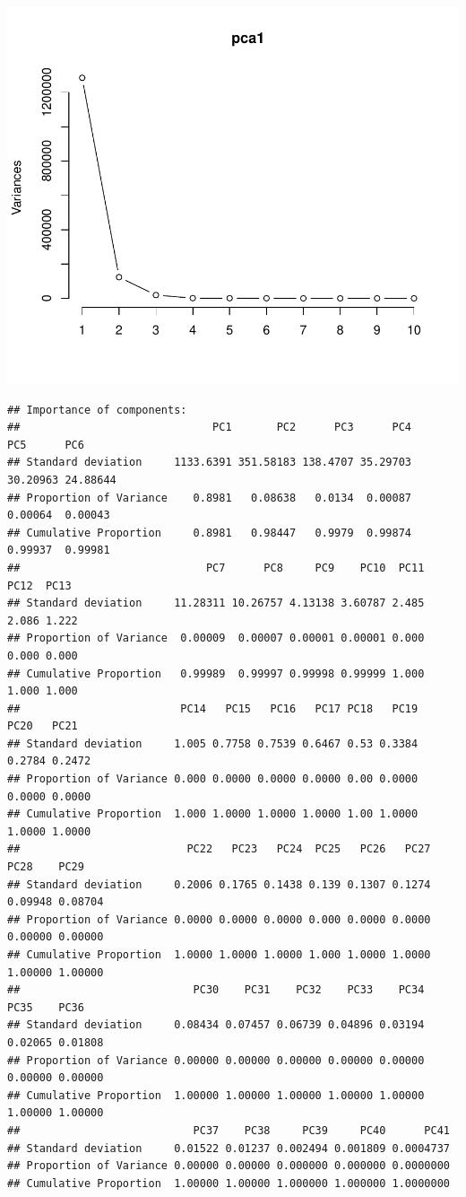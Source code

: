 \documentclass[11pt,preprint, authoryear]{elsarticle}
\numberwithin{equation}{section}
\numberwithin{figure}{section}
\numberwithin{table}{section}
\begin{document}
\includegraphics{Essay_files/figure-latex/unnamed-chunk-5-1.pdf}

\begin{verbatim}
## Importance of components:
##                              PC1       PC2      PC3      PC4      PC5      PC6
## Standard deviation     1133.6391 351.58183 138.4707 35.29703 30.20963 24.88644
## Proportion of Variance    0.8981   0.08638   0.0134  0.00087  0.00064  0.00043
## Cumulative Proportion     0.8981   0.98447   0.9979  0.99874  0.99937  0.99981
##                             PC7      PC8     PC9    PC10  PC11  PC12  PC13
## Standard deviation     11.28311 10.26757 4.13138 3.60787 2.485 2.086 1.222
## Proportion of Variance  0.00009  0.00007 0.00001 0.00001 0.000 0.000 0.000
## Cumulative Proportion   0.99989  0.99997 0.99998 0.99999 1.000 1.000 1.000
##                         PC14   PC15   PC16   PC17 PC18   PC19   PC20   PC21
## Standard deviation     1.005 0.7758 0.7539 0.6467 0.53 0.3384 0.2784 0.2472
## Proportion of Variance 0.000 0.0000 0.0000 0.0000 0.00 0.0000 0.0000 0.0000
## Cumulative Proportion  1.000 1.0000 1.0000 1.0000 1.00 1.0000 1.0000 1.0000
##                          PC22   PC23   PC24  PC25   PC26   PC27    PC28    PC29
## Standard deviation     0.2006 0.1765 0.1438 0.139 0.1307 0.1274 0.09948 0.08704
## Proportion of Variance 0.0000 0.0000 0.0000 0.000 0.0000 0.0000 0.00000 0.00000
## Cumulative Proportion  1.0000 1.0000 1.0000 1.000 1.0000 1.0000 1.00000 1.00000
##                           PC30    PC31    PC32    PC33    PC34    PC35    PC36
## Standard deviation     0.08434 0.07457 0.06739 0.04896 0.03194 0.02065 0.01808
## Proportion of Variance 0.00000 0.00000 0.00000 0.00000 0.00000 0.00000 0.00000
## Cumulative Proportion  1.00000 1.00000 1.00000 1.00000 1.00000 1.00000 1.00000
##                           PC37    PC38     PC39     PC40      PC41
## Standard deviation     0.01522 0.01237 0.002494 0.001809 0.0004737
## Proportion of Variance 0.00000 0.00000 0.000000 0.000000 0.0000000
## Cumulative Proportion  1.00000 1.00000 1.000000 1.000000 1.0000000
\end{verbatim}
\end{document}

